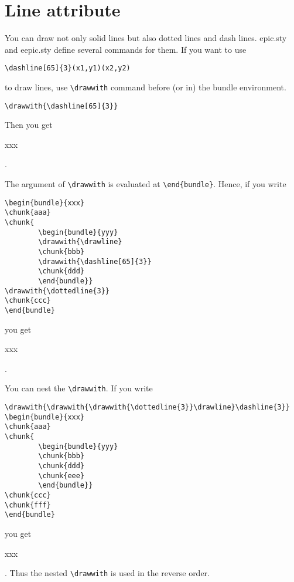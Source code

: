 \documentclass{article}
\begin{document}
\section{Line attribute}

You can draw not only solid lines but also
dotted lines and dash lines.
epic.sty and eepic.sty define several commands for them.
If you want to use
\begin{verbatim}
\dashline[65]{3}(x1,y1)(x2,y2)
\end{verbatim}
to draw lines, use \verb|\drawwith| command
before (or in) the bundle environment.
\begin{verbatim}
\drawwith{\dashline[65]{3}}
\end{verbatim}

Then you get
\begin{bundle}{xxx}
\end{bundle}.

The argument of \verb|\drawwith| is evaluated
at \verb|\end{bundle}|. Hence, if you write
\begin{verbatim}
\begin{bundle}{xxx}
\chunk{aaa}
\chunk{
        \begin{bundle}{yyy}
        \drawwith{\drawline}
        \chunk{bbb}
        \drawwith{\dashline[65]{3}}
        \chunk{ddd}
        \end{bundle}}
\drawwith{\dottedline{3}}
\chunk{ccc}
\end{bundle}
\end{verbatim}
you get
\begin{bundle}{xxx}
\end{bundle}.

You can nest the \verb|\drawwith|. If you write
\begin{verbatim}
\drawwith{\drawwith{\drawwith{\dottedline{3}}\drawline}\dashline{3}}
\begin{bundle}{xxx}
\chunk{aaa}
\chunk{
        \begin{bundle}{yyy}
        \chunk{bbb}
        \chunk{ddd}
        \chunk{eee}
        \end{bundle}}
\chunk{ccc}
\chunk{fff}
\end{bundle}
\end{verbatim}
you get
\begin{bundle}{xxx}
\end{bundle}.
Thus the nested \verb|\drawwith| is used in the reverse order.
\end{document}
